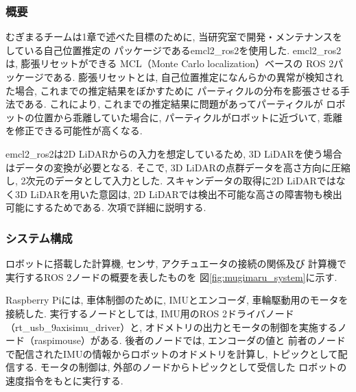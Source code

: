 \subsubsection{概要}
むぎまるチームは1章で述べた目標のために, 
当研究室で開発・メンテナンスをしている自己位置推定の
パッケージであるemcl2\_ros2\cite{emcl2_ros2}を使用した. 
emcl2\_ros2は, 膨張リセット\cite{ueda2004iros}ができる
MCL（Monte Carlo localization\cite{fox1999etal}）ベースの
ROS 2パッケージである. 
膨張リセットとは, 
自己位置推定になんらかの異常が検知された場合, 
これまでの推定結果をぼかすために
パーティクルの分布を膨張させる手法である. 
これにより, これまでの推定結果に問題があってパーティクルが
ロボットの位置から乖離していた場合に, 
パーティクルがロボットに近づいて, 
乖離を修正できる可能性が高くなる. 


emcl2\_ros2は2D LiDARからの入力を想定しているため, 
3D LiDARを使う場合はデータの変換が必要となる. 
そこで, 3D LiDARの点群データを高さ方向に圧縮し, 
2次元のデータとして入力とした. 
スキャンデータの取得に2D LiDARではなく3D LiDARを用いた意図は, 
2D LiDARでは検出不可能な高さの障害物も検出可能にするためである. 
次項で詳細に説明する. 

\subsubsection{システム構成}
ロボットに搭載した計算機, センサ, アクチュエータの接続の関係及び
計算機で実行するROS 2ノードの概要を表したものを
図\ref{fig:mugimaru_system}に示す. 

Raspberry Piには, 車体制御のために, IMUとエンコーダ, 車輪駆動用のモータを接続した. 
実行するノードとしては, IMU用のROS 2ドライバノード（rt\_usb\_9axisimu\_driver）と, 
オドメトリの出力とモータの制御を実施するノード（raspimouse）がある. 
後者のノードでは, エンコーダの値と
前者のノードで配信されたIMUの情報からロボットのオドメトリを計算し, 
トピックとして配信する. 
モータの制御は, 外部のノードからトピックとして受信した
ロボットの速度指令をもとに実行する. 

